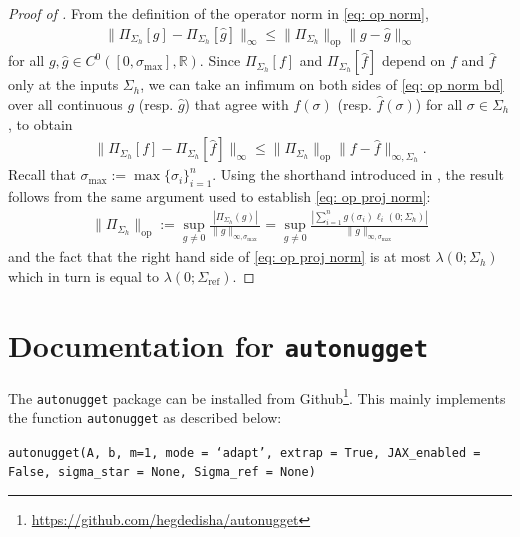 \documentclass[10pt]{article} %
\newcommand{\nugget}{\sigma}
\newcommand{\nuggets}{\Sigma}
\begin{document}
\begin{proof}[Proof of ]
From the definition of the operator norm in \eqref{eq: op norm},
\begin{align}
\| \Pi_{\Sigma_h}[g] - \Pi_{\Sigma_h}[\hat{g}] \|_\infty  \leq \| \Pi_{\Sigma_h} \|_{\mathrm{op}} \|g - \hat{g}\|_{\infty}  \label{eq: op norm bd}
\end{align}
for all $g , \hat{g} \in C^0([0,\nugget_{\max}],\mathbb{R})$.
Since $\Pi_{\nuggets_h}[f]$ and $\Pi_{\nuggets_h}[\hat{f}]$ depend on $f$ and $\hat{f}$ only at the inputs $\nuggets_h$, we can take an infimum on both sides of \eqref{eq: op norm bd} over all continuous $g$ (resp. $\hat{g}$) that agree with $f(\nugget)$ (resp. $\hat{f}(\nugget)$) for all $\nugget \in \nuggets_h$, to obtain
\begin{align*}
\| \Pi_{\Sigma_h}[f] - \Pi_{\Sigma_h}[\hat{f}] \|_\infty  \leq \| \Pi_{\Sigma_h} \|_{\mathrm{op}} \|f - \hat{f}\|_{\infty, \Sigma_h} .
\end{align*}
Recall that $\nugget_{\max} := \max\{\nugget_i\}_{i=1}^n$.
Using the shorthand introduced in , the result follows from the same argument used to establish \eqref{eq: op proj norm}:
\begin{align*}
\|\Pi_{\Sigma_h}\|_{\mathrm{op}} := \sup_{g \neq 0} \frac{|\Pi_{\Sigma_h}(g)|}{\|g\|_{\infty,\nugget_{\max}}} 
= \sup_{g \neq 0} \frac{| \sum_{i=1}^n g(\sigma_i) \ell_i(0;\Sigma_h) |}{\|g\|_{\infty,\nugget_{\max}}}  
\end{align*}
and the fact that the right hand side of \eqref{eq: op proj norm} is at most $\lambda(0 ; \Sigma_h)$ which in turn is equal to $\lambda(0;\Sigma_{\mathrm{ref}})$.
\end{proof}



\section{Documentation for \texttt{autonugget}}
\label{app: documents}
\label{app: package}

The \texttt{autonugget} package can be installed from Github\footnote{\url{https://github.com/hegdedisha/autonugget}}. This mainly implements the function \texttt{autonugget} as described below:

\texttt{autonugget(A, b, m=1, mode = `adapt', extrap = True, JAX\_enabled = False, sigma\_star = None, Sigma\_ref = None)}
\end{document}
